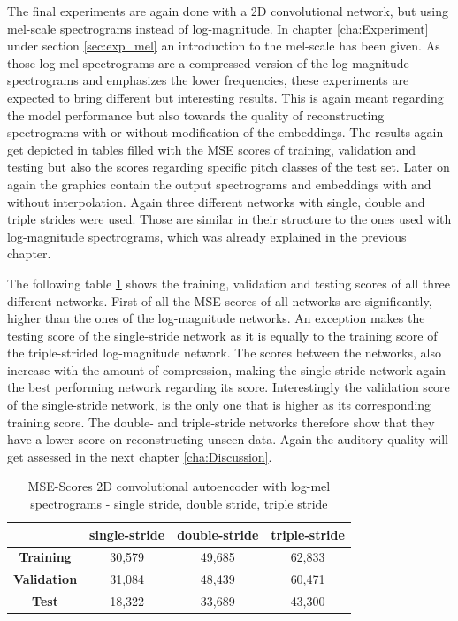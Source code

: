 The final experiments are again done with a 2D convolutional network, but using mel-scale spectrograms instead of log-magnitude. In chapter \ref{cha:Experiment} under section \ref{sec:exp_mel} an introduction to the mel-scale has been given. As those log-mel spectrograms are a compressed version of the log-magnitude spectrograms and emphasizes the lower frequencies, these experiments are expected to bring different but interesting results. This is again meant regarding the model performance but also towards the quality of reconstructing spectrograms with or without modification of the embeddings. The results again get depicted in tables filled with the MSE scores of training, validation and testing but also the scores regarding specific pitch classes of the test set. Later on again the graphics contain the output spectrograms and embeddings with and without interpolation. Again three different networks with single, double and triple strides were used. Those are similar in their structure to the ones used with log-magnitude spectrograms, which was already explained in the previous chapter.

The following table \ref{tab:res_scores_2D_mel} shows the training, validation and testing scores of all three different networks. First of all the MSE scores of all networks are significantly, higher than the ones of the log-magnitude networks. An exception makes the testing score of the single-stride network as it is equally to the training score of the triple-strided log-magnitude network. The scores between the networks, also increase with the amount of compression, making the single-stride network again the best performing network regarding its score. Interestingly the validation score of the single-stride network, is the only one that is higher as its corresponding training score. The double- and triple-stride networks therefore show that they have a lower score on reconstructing unseen data. Again the auditory quality will get assessed in the next chapter \ref{cha:Discussion}.

\begin{table}[htb!]
    \centering
    \captionsetup{justification=centering}
    \begin{tabular}{|c|c|c|c|}
        \hline
         & \textbf{single-stride} & \textbf{double-stride} & \textbf{triple-stride} \\
         \hline
        \textbf{Training} & 30,579 & 49,685 & 62,833 \\
        \hline
        \textbf{Validation} & 31,084 & 48,439 & 60,471\\
        \hline
        \textbf{Test} & 18,322 & 33,689 & 43,300\\
        \hline
    \end{tabular}
    \caption{MSE-Scores 2D convolutional autoencoder with log-mel spectrograms - single stride, double stride, triple stride}
    \label{tab:res_scores_2D_mel}
\end{table}

